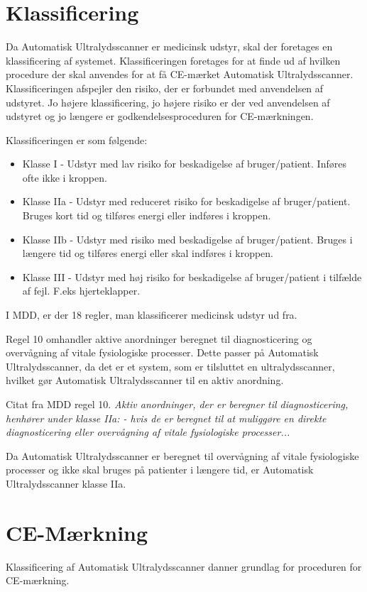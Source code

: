 \section{Klassificering}
Da Automatisk Ultralydsscanner er medicinsk udstyr, skal der foretages en klassificering af systemet. Klassificeringen foretages for at finde ud af hvilken procedure der skal anvendes for at få CE-mærket Automatisk Ultralydsscanner. Klassificeringen afspejler den risiko, der er forbundet med anvendelsen af udstyret. Jo højere klassificering, jo højere risiko er der ved anvendelsen af udstyret og jo længere er godkendelsesproceduren for CE-mærkningen. 

Klassificeringen er som følgende: 

\let\labelitemi\labelitemii
\begin{itemize}
\item Klasse I - Udstyr med lav risiko for beskadigelse af bruger/patient. Inføres ofte ikke i kroppen.
\item Klasse IIa - Udstyr med reduceret risiko for beskadigelse af bruger/patient. Bruges kort tid og tilføres energi eller indføres i kroppen.  
\item Klasse IIb -  Udstyr med risiko med beskadigelse af bruger/patient. Bruges i længere tid og tilføres energi eller skal indføres i kroppen. 
\item Klasse III - Udstyr med høj risiko for beskadigelse af bruger/patient i tilfælde af fejl. F.eks hjerteklapper. 
\end{itemize} \cite{Delta}

I MDD, er der 18 regler, man klassificerer medicinsk udstyr ud fra. 

Regel 10 omhandler aktive anordninger beregnet til diagnosticering og overvågning af vitale fysiologiske processer. Dette passer på Automatisk Ultralydsscanner, da det er et system, som er tilsluttet en ultralydsscanner, hvilket gør Automatisk Ultralydsscanner til en aktiv anordning.  

Citat fra MDD regel 10. 
\emph{Aktiv anordninger, der er beregner til diagnosticering, henhører under klasse IIa: - hvis de er beregnet til at muliggøre en direkte diagnosticering eller overvågning af vitale fysiologiske processer...}

Da Automatisk Ultralydsscanner er beregnet til overvågning af vitale fysiologiske processer og ikke skal bruges på patienter i længere tid, er Automatisk Ultralydsscanner klasse IIa. 

\section{CE-Mærkning}
Klassificering af Automatisk Ultralydsscanner danner grundlag for proceduren for CE-mærkning. 

